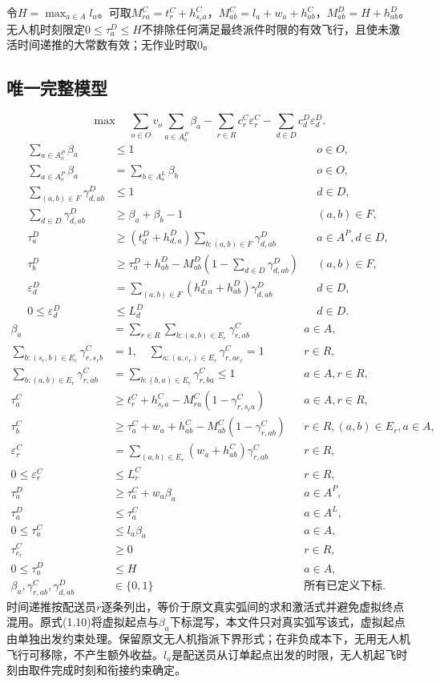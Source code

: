 \documentclass[UTF8,11pt]{ctexart}
\begin{document}
令$H=\max_{a\in A}l_a$。可取$M_{ra}^C=t_r^C+h_{s_ra}^C$，$M_{ab}^C=l_a+w_a+h_{ab}^C$，$M_{ab}^D=H+h_{ab}^D$。无人机时刻限定$0\leq\tau_a^D\leq H$不排除任何满足最终派件时限的有效飞行，且使未激活时间递推的大常数有效；无作业时取0。
\subsection*{唯一完整模型}
\begin{equation}
\max\quad \sum_{o\in O}v_o\sum_{a\in A_o^P}\beta_a-\sum_{r\in R}c_r^C\varepsilon_r^C-\sum_{d\in D}c_d^D\varepsilon_d^D.
\end{equation}
\begin{align}
\sum_{a\in A_o^P}\beta_a&\leq1&&o\in O,\\
\sum_{a\in A_o^P}\beta_a&=\sum_{b\in A_o^L}\beta_b&&o\in O,\\
\sum_{(a,b)\in F}\gamma^D_{d,ab}&\leq1&&d\in D,\\
\sum_{d\in D}\gamma^D_{d,ab}&\geq\beta_a+\beta_b-1&&(a,b)\in F,\\
\tau_a^D&\geq(t_d^D+h_{d,a}^D)\sum_{b:(a,b)\in F}\gamma^D_{d,ab}&&a\in A^P,d\in D,\\
\tau_b^D&\geq\tau_a^D+h_{ab}^D-M_{ab}^D(1-\sum_{d\in D}\gamma^D_{d,ab})&&(a,b)\in F,\\
\varepsilon_d^D&=\sum_{(a,b)\in F}(h_{d,a}^D+h_{ab}^D)\gamma^D_{d,ab}&&d\in D,\\
0\leq\varepsilon_d^D&\leq L_d^D&&d\in D.
\end{align}
\begin{align}
\beta_a&=\sum_{r\in R}\sum_{b:(a,b)\in E_r}\gamma^C_{r,ab}&&a\in A,\\
\sum_{b:(s_r,b)\in E_r}\gamma^C_{r,s_rb}&=1,\quad\sum_{a:(a,e_r)\in E_r}\gamma^C_{r,ae_r}=1&&r\in R,\\
\sum_{b:(a,b)\in E_r}\gamma^C_{r,ab}&=\sum_{b:(b,a)\in E_r}\gamma^C_{r,ba}\leq1&&a\in A,r\in R,\\
\tau_a^C&\geq t_r^C+h_{s_ra}^C-M_{ra}^C(1-\gamma^C_{r,s_ra})&&a\in A,r\in R,\\
\tau_b^C&\geq\tau_a^C+w_a+h_{ab}^C-M_{ab}^C(1-\gamma^C_{r,ab})&&r\in R,(a,b)\in E_r,a\in A,\\
\varepsilon_r^C&=\sum_{(a,b)\in E_r}(w_a+h_{ab}^C)\gamma^C_{r,ab}&&r\in R,\\
0\leq\varepsilon_r^C&\leq L_r^C&&r\in R,\\
\tau_a^D&\geq\tau_a^C+w_a\beta_a&&a\in A^P,\\
\tau_a^D&\leq\tau_a^C&&a\in A^L,\\
0\leq\tau_a^C&\leq l_a\beta_a&&a\in A,\\
\tau_{e_r}^C&\geq0&&r\in R,\\
0\leq\tau_a^D&\leq H&&a\in A,\\
\beta_a,\gamma^C_{r,ab},\gamma^D_{d,ab}&\in\{0,1\}&&\text{所有已定义下标}.
\end{align}
时间递推按配送员$r$逐条列出，等价于原文真实弧间的求和激活式并避免虚拟终点混用。原式(1.10)将虚拟起点与$\beta_a$下标混写，本文件只对真实弧写该式，虚拟起点由单独出发约束处理。保留原文无人机指派下界形式；在非负成本下，无用无人机飞行可移除，不产生额外收益。$l_a$是配送员从订单起点出发的时限，无人机起飞时刻由取件完成时刻和衔接约束确定。
\end{document}
